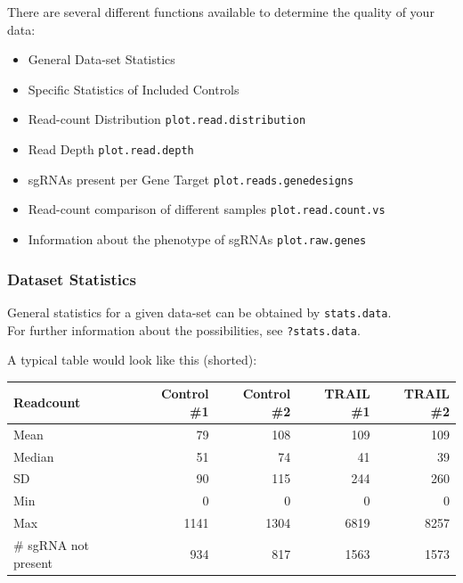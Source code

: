 \documentclass[]{article}
\providecommand{\tightlist}{%
  \setlength{\itemsep}{0pt}\setlength{\parskip}{0pt}}
\begin{document}
There are several different functions available to determine the quality
of your data:

\begin{itemize}
\tightlist
\item
  General Data-set Statistics
\item
  Specific Statistics of Included Controls
\item
  Read-count Distribution \texttt{plot.read.distribution}
\item
  Read Depth \texttt{plot.read.depth}
\item
  sgRNAs present per Gene Target \texttt{plot.reads.genedesigns}
\item
  Read-count comparison of different samples \texttt{plot.read.count.vs}
\item
  Information about the phenotype of sgRNAs \texttt{plot.raw.genes}
\end{itemize}

\subsubsection{Dataset Statistics}\label{dataset-statistics}

General statistics for a given data-set can be obtained by
\texttt{stats.data}.\\
For further information about the possibilities, see
\texttt{?stats.data}.

A typical table would look like this (shorted):

\begin{longtable}[c]{@{}lrrrr@{}}
\toprule
Readcount & Control \#1 & Control \#2 & TRAIL \#1 & TRAIL
\#2\tabularnewline
\midrule
\endhead
Mean & 79 & 108 & 109 & 109\tabularnewline
Median & 51 & 74 & 41 & 39\tabularnewline
SD & 90 & 115 & 244 & 260\tabularnewline
Min & 0 & 0 & 0 & 0\tabularnewline
Max & 1141 & 1304 & 6819 & 8257\tabularnewline
\# sgRNA not present & 934 & 817 & 1563 & 1573\tabularnewline
\bottomrule
\end{longtable}
\end{document}
